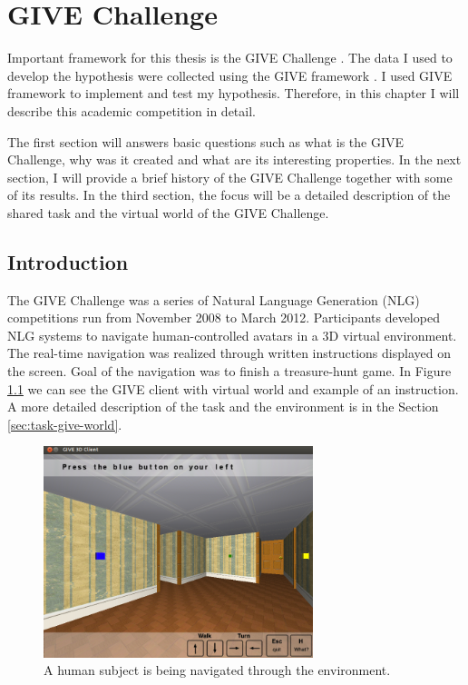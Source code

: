 \chapter{GIVE Challenge}
\label{chap:give-challenge}
Important framework for this thesis is the GIVE Challenge \citep{koller2010first}. The data I used to develop the hypothesis were collected using the GIVE framework \citep{koller2010first}. I used GIVE framework to implement and test my hypothesis. Therefore, in this chapter I will describe this academic competition in detail.  

The first section will answers basic questions such as what is the GIVE Challenge, why was it created and what are its interesting properties. In the next section, I will provide a brief history of the GIVE Challenge together with some of its results. In the third section, the focus will be a detailed description of the shared task and the virtual world of the GIVE Challenge.

\section{Introduction}
The GIVE Challenge was a series of Natural Language Generation (NLG) competitions run from November 2008 to March 2012. Participants developed NLG systems to navigate human-controlled avatars in a 3D virtual environment. The real-time navigation was realized through written instructions displayed on the screen. Goal of the navigation was to finish a treasure-hunt game. In Figure \ref{fig:give-client} we can see the GIVE client with virtual world and example of an instruction. A more detailed description of the task and the environment is in the Section \ref{sec:task-give-world}.

\begin{figure}[!htbp]
  \centering
	\includegraphics[width=0.7\textwidth]{Images/give-client}
	\caption{A human subject is being navigated through the environment.}
	\label{fig:give-client}
\end{figure}

